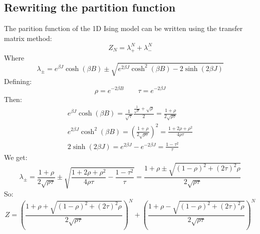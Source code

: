 \documentclass{article}
\begin{document}
\subsection{Rewriting the partition function}
The parition function of the 1D Ising model can be written using the transfer matrix method:
\begin{equation}
    Z_N = \lambda_{+}^N + \lambda_{-}^N
\end{equation}
Where
\begin{equation}
    \lambda_{\pm} = e^{\beta J}\cosh(\beta B) \pm \sqrt{e^{2\beta J}\cosh^2(\beta B) - 2\sinh(2\beta J)}
\end{equation}
Defining:
\begin{equation}
    \rho = e^{-2 \beta B} \qquad \tau = e^{-2 \beta J}
\end{equation}
Then:
\begin{equation}
\begin{gathered}
    e^{\beta J}\cosh(\beta B) = \frac{1}{\sqrt{\tau}}\frac{\frac{1}{\sqrt{\rho}} + \sqrt{\rho}}{2} = \frac{1 + \rho}{2\sqrt{\rho\tau}}
    \\
    e^{2\beta J}\cosh^2(\beta B) = \left(\frac{1 + \rho}{2\sqrt{\rho\tau}}\right)^2 = \frac{1 + 2\rho + \rho^2}{4\rho\tau}
    \\
    2\sinh(2\beta J) = e^{2\beta J} - e^{-2\beta J} = \frac{1 - \tau^2}{\tau}
\end{gathered}
\end{equation}
We get:
\begin{equation}
    \lambda_{\pm} = \frac{1 + \rho}{2\sqrt{\rho\tau}} \pm \sqrt{\frac{1 + 2\rho + \rho^2}{4\rho\tau} - \frac{1 - \tau^2}{\tau}} = \frac{1 + \rho \pm \sqrt{\left(1 - \rho\right)^2 + \left(2\tau\right)^2\rho}}{2\sqrt{\rho\tau}}
\end{equation}
So:
\begin{equation}
    Z = \left(\frac{1 + \rho + \sqrt{\left(1 - \rho\right)^2 + \left(2\tau\right)^2\rho}}{2\sqrt{\rho\tau}}\right)^N + \left(\frac{1 + \rho - \sqrt{\left(1 - \rho\right)^2 + \left(2\tau\right)^2\rho}}{2\sqrt{\rho\tau}}\right)^N
\end{equation}
\end{document}
